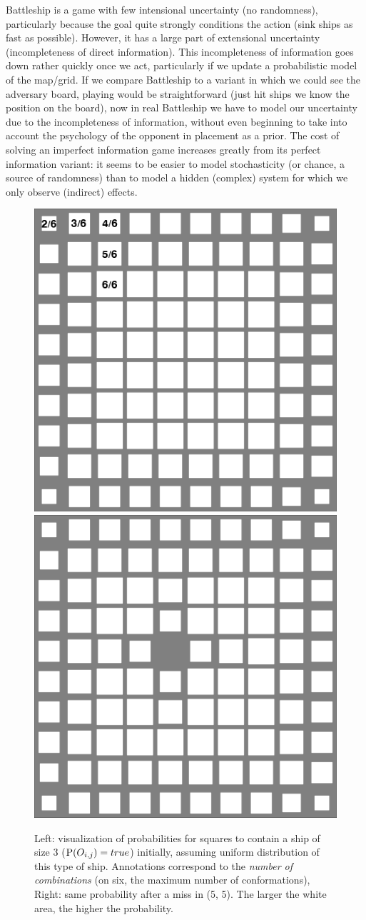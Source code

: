 Battleship is a game with few intensional uncertainty (no randomness), particularly because the goal quite strongly conditions the action (sink ships as fast as possible). However, it has a large part of extensional uncertainty (incompleteness of direct information). This incompleteness of information goes down rather quickly once we act, particularly if we update a probabilistic model of the map/grid. If we compare Battleship to a variant in which we could see the adversary board, playing would be straightforward (just hit ships we know the position on the board), now in real Battleship we have to model our uncertainty due to the incompleteness of information, without even beginning to take into account the psychology of the opponent in placement as a prior. The cost of solving an imperfect information game increases greatly from its perfect information variant: it seems to be easier to model stochasticity (or chance, a source of randomness) than to model a hidden (complex) system for which we only observe (indirect) effects.

\begin{figure}[h!]
\begin{center}
\includegraphics[width=0.47\columnwidth]{images/battleship_board_3_init_annotated.png} \includegraphics[width=0.47\columnwidth]{images/battleship_board_3_1miss.png}
\caption{Left: visualization of probabilities for squares to contain a ship of size 3 ($\mathrm{P}(O_{i,j})=true$) initially, assuming uniform distribution of this type of ship. Annotations correspond to the \textit{number of combinations} (on six, the maximum number of conformations), Right: same probability after a miss in (5, 5). The larger the white area, the higher the probability.}
\label{fig:battleship}
\end{center}
\end{figure}


